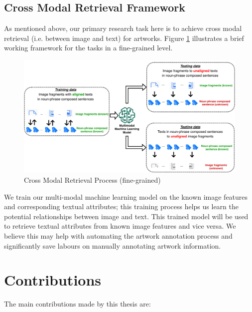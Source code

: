 \subsection{Cross Modal Retrieval Framework}

As mentioned above, our primary research task here is to achieve cross modal retrieval (i.e. between image and text) for artworks. Figure \ref{fig:framework} illustrates a brief working framework for the tasks in a fine-grained level.

\begin{figure}[h!]
\centering
\includegraphics[width=\textwidth]{framework.pdf}
\caption{Cross Modal Retrieval Process (fine-grained)}
\label{fig:framework}
\end{figure}

We train our multi-modal machine learning model on the known image features and corresponding textual attributes; this training process helps us learn the potential relationships between image and text. This trained model will be used to retrieve textual attributes from known image features and vice versa. We believe this may help with automating the artwork annotation process and significantly save labours on manually annotating artwork information.


\section{Contributions}
The main contributions made by this thesis are:

